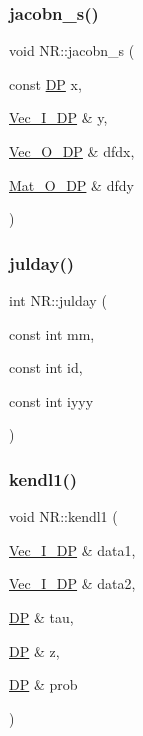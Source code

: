 \subsubsection{\texorpdfstring{jacobn\_s()}{jacobn\_s()}}
{\footnotesize\ttfamily void N\+R\+::jacobn\+\_\+s (\begin{DoxyParamCaption}\item[{const \mbox{\hyperlink{namespaceNR_af6ff762dd605ff477b8e52387253a02a}{DP}}}]{x,  }\item[{\mbox{\hyperlink{namespaceNR_a9f943da53862537c552e2a770cb170ae}{Vec\+\_\+\+I\+\_\+\+DP}} \&}]{y,  }\item[{\mbox{\hyperlink{namespaceNR_a970094d23441f8ef6a45282a7eb2103d}{Vec\+\_\+\+O\+\_\+\+DP}} \&}]{dfdx,  }\item[{\mbox{\hyperlink{namespaceNR_adc1f8da33094b6bbeb1f5f899515ce54}{Mat\+\_\+\+O\+\_\+\+DP}} \&}]{dfdy }\end{DoxyParamCaption})}

\mbox{\label{namespaceNR_adcf22e2f352f18973efcc6a828196a69}} 
\subsubsection{\texorpdfstring{julday()}{julday()}}
{\footnotesize\ttfamily int N\+R\+::julday (\begin{DoxyParamCaption}\item[{const int}]{mm,  }\item[{const int}]{id,  }\item[{const int}]{iyyy }\end{DoxyParamCaption})}

\mbox{\label{namespaceNR_a0cbcf6c9ade0e1df0bb132f18485ad14}} 
\subsubsection{\texorpdfstring{kendl1()}{kendl1()}}
{\footnotesize\ttfamily void N\+R\+::kendl1 (\begin{DoxyParamCaption}\item[{\mbox{\hyperlink{namespaceNR_a9f943da53862537c552e2a770cb170ae}{Vec\+\_\+\+I\+\_\+\+DP}} \&}]{data1,  }\item[{\mbox{\hyperlink{namespaceNR_a9f943da53862537c552e2a770cb170ae}{Vec\+\_\+\+I\+\_\+\+DP}} \&}]{data2,  }\item[{\mbox{\hyperlink{namespaceNR_af6ff762dd605ff477b8e52387253a02a}{DP}} \&}]{tau,  }\item[{\mbox{\hyperlink{namespaceNR_af6ff762dd605ff477b8e52387253a02a}{DP}} \&}]{z,  }\item[{\mbox{\hyperlink{namespaceNR_af6ff762dd605ff477b8e52387253a02a}{DP}} \&}]{prob }\end{DoxyParamCaption})}

